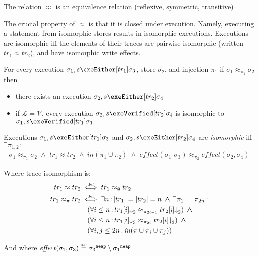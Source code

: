 \documentclass[runningheads,a4paper]{llncs}
\DeclareMathOperator{\band}{\bm{\;\land\;}}
\DeclareMathOperator{\suchthat}{:}
\newcommand*{\qvars}[2]{#1_{#2}}
\newcommand*{\cardinality}[1]{\left|{#1}\right|}
\newcommand*{\defeq}{\stackrel{\text{\tiny def}}{=}}
\newcommand*{\defiff}{\stackrel{\text{\tiny def}}{\iff}}
\newcommand*{\evalat}{{\downarrow}}
\newcommand{\tr}{tr}
\newcommand*\iso{\approx}
\newcommand*\Lsemantics{\mathcal{L}}
\newcommand*\Vsemantics{\mathcal{V}}
\newcommand{\diff}{\mathit{effect}}
\newcommand*{\bijection}[1]{\mathit{in}{\left(#1\right)}}
\newcommand*{\store}{\sigma}
\newcommand*{\heapof}[1]{{#1}^{\mathtt{heap}}}
\newcommand*{\isoref}{\hyperref[def:global isomorphism]{\ensuremath{\iso}}}
\begin{document}
\begin{lemma}\label{lem:isomorphism is equivalence}
The relation $\iso$ is an equivalence relation (reflexive, symmetric, transitive) 
\end{lemma}

The crucial property of \isoref{} is that it is closed under execution. Namely, executing a statement from isomorphic stores results in isomorphic executions. Executions are isomorphic iff the elements of their traces are pairwise isomorphic (written $\tr_1 \iso \tr_2$), and have isomorphic write effects. 

\begin{lemma}\label{lem:closed under isomorphism}\setlength{\parindent}{0cm}

For every execution $\store_1,s\exeEither[\tr_1]\store_3$, store $\store_2$, and injection $\pi_1$ if $\store_1 \iso_{\pi_1} \store_2$ then
\begin{itemize} 
	\item there exists an execution $\store_2,s\exeEither[\tr_2]\store_4$
	\item if $\Lsemantics{}=\Vsemantics{}$, every execution $\store_2,s\exeVerified[\tr_2]\store_4$ is isomorphic to $\store_1,s\exeVerified[\tr_1]\store_3$
\end{itemize}

Executions $\store_1,s\exeEither[\tr_1]\store_3$ and $\store_2,s\exeEither[\tr_2]\store_4$ are \emph{isomorphic} iff $\exists \qvars{\pi}{1,2} \suchthat$
\[\begin{aligned}
\store_1 \iso_{\pi_1} \store_2 \band
  	\tr_1 \iso \tr_2 \band
	\bijection{\pi_1\cup\pi_2} \band
	\diff(\store_1,\store_3) \iso_{\pi_2} \diff(\store_2,\store_4)
\end{aligned}\]

Where trace isomorphism is:
\[\begin{aligned} 
\tr_1 \iso \tr_2 &\defiff \tr_1 \iso_\emptyset \tr_2 \\
\tr_1 \iso_\pi \tr_2 &\defiff \exists n \suchthat
	\cardinality{\tr_1}=\cardinality{\tr_2}=n \band \exists \pi_1\ldots\pi_{2n}\suchthat \\
&\quad	(\forall i \le n \suchthat \tr_1[i]\evalat_{2}\iso_{\pi_{2i-1}}\tr_2[i]\evalat_{2}) \band \\
&\quad	(\forall i \le n \suchthat \tr_1[i]\evalat_{3}\iso_{\pi_{2i}}\tr_2[i]\evalat_{3}) \band \\
&\quad	(\forall i,j \le 2n \suchthat \bijection{\pi \cup \pi_i \cup \pi_j})
\end{aligned}\]

And where $\diff(\store_1,\store_3) \defeq \heapof{\store_3} \setminus \heapof{\store_1}$
\end{lemma}
\end{document}
